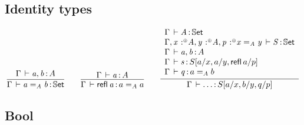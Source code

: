 \documentclass[11pt]{article}
\theoremstyle{plain}
\begin{document}
%
%

\subsection{Identity types}
\[
	\infer{
		\ofdtp{\Gamma}{\idtp A a b}{\types}
	}{
		\oftp{\Gamma}{a, b}{A}
	}
	\qquad
	\infer{
		\oftp{\Gamma}{\refl\,a}{\idtp A a a}
	}{
		\oftp{\Gamma}{a}{A}
	}
	\qquad
	\infer{
		\oftp{\Gamma}{\ldots}{S[a/x,b/y,q/p]}
	}{
		\begin{array}{l}
			\ofdtp{\Gamma}{A}{\types} \\
			\ofdtp{\Gamma, \tpvar{x}{\coc}{A}, \tpvar{y}{\coc}{A}, \tpvar{p}{\coc}{\idtp A x y}}{S}{\types} \\
			\oftp{\Gamma}{a, b}{A} \\
			\oftp{\Gamma}{s}{S[a/x, a/y, \refl\,a/p]} \\
			\oftp{\Gamma}{q}{\idtp A a b}
		\end{array}
	}
\]

\subsection{Bool}
\end{document}
